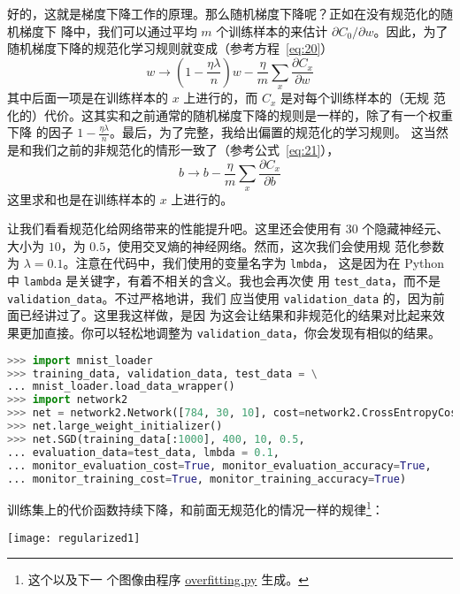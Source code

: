 好的，这就是梯度下降工作的原理。那么随机梯度下降呢？正如在没有规范化的随机梯度下
降中，我们可以通过平均 $m$ 个训练样本的\minibatch{}来估计 $\partial C_0/\partial
w$。因此，为了随机梯度下降的规范化学习规则就变成（参考方程~\eqref{eq:20}）
\begin{equation}
  w \rightarrow \left(1-\frac{\eta \lambda}{n}\right) w -\frac{\eta}{m}
  \sum_x \frac{\partial C_x}{\partial w}
  \label{eq:93}\tag{93}
\end{equation}
其中后面一项是在训练样本的\minibatch{} $x$ 上进行的，而 $C_x$ 是对每个训练样本的（无规
  范化的）代价。这其实和之前通常的随机梯度下降的规则是一样的，除了有一个权重下降
的因子 $1-\frac{\eta \lambda}{n}$。最后，为了完整，我给出偏置的规范化的学习规则。
这当然是和我们之前的非规范化的情形一致了（参考公式~\eqref{eq:21}），
\begin{equation}
  b \rightarrow b - \frac{\eta}{m} \sum_x \frac{\partial C_x}{\partial b}
  \label{eq:94}\tag{94}
\end{equation}
这里求和也是在训练样本的\minibatch{} $x$ 上进行的。

让我们看看规范化给网络带来的性能提升吧。这里还会使用有 $30$ 个隐藏神经元、\minibatch{}
大小为 $10$，\learningrate{}为 $0.5$，使用交叉熵的神经网络。然而，这次我们会使用规
范化参数为 $\lambda = 0.1$。注意在代码中，我们使用的变量名字为 \lstinline!lmbda!，
这是因为在 Python 中 \lstinline!lambda! 是关键字，有着不相关的含义。我也会再次使
用 \lstinline!test_data!，而不是 \lstinline!validation_data!。不过严格地讲，我们
应当使用 \lstinline!validation_data! 的，因为前面已经讲过了。这里我这样做，是因
为这会让结果和非规范化的结果对比起来效果更加直接。你可以轻松地调整为
\lstinline!validation_data!，你会发现有相似的结果。

\begin{lstlisting}[language=Python]
>>> import mnist_loader
>>> training_data, validation_data, test_data = \
... mnist_loader.load_data_wrapper()
>>> import network2
>>> net = network2.Network([784, 30, 10], cost=network2.CrossEntropyCost)
>>> net.large_weight_initializer()
>>> net.SGD(training_data[:1000], 400, 10, 0.5,
... evaluation_data=test_data, lmbda = 0.1,
... monitor_evaluation_cost=True, monitor_evaluation_accuracy=True,
... monitor_training_cost=True, monitor_training_accuracy=True)
\end{lstlisting}

训练集上的代价函数持续下降，和前面无规范化的情况一样的规律\footnote{这个以及下一
  个图像由程序
  \href{https://github.com/mnielsen/neural-networks-and-deep-learning/blob/master/fig/overfitting.py}{overfitting.py}
  生成。}：
\begin{center}
  \texttt{[image: regularized1]}
\end{center}

